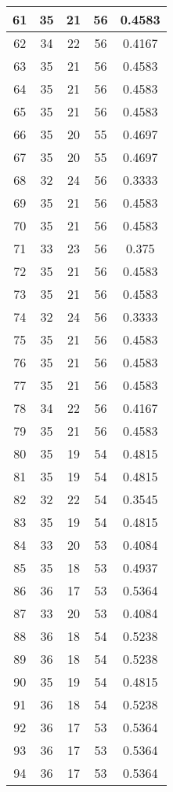 \documentclass[letterpaper, 12pt]{article}
\begin{document}
\begin{longtable}{|c|c|c|c|c|}
\hline
61 & 35 & 21 & 56 & 0.4583 \\
\hline
62 & 34 & 22 & 56 & 0.4167 \\
\hline
63 & 35 & 21 & 56 & 0.4583 \\
\hline
64 & 35 & 21 & 56 & 0.4583 \\
\hline
65 & 35 & 21 & 56 & 0.4583 \\
\hline
66 & 35 & 20 & 55 & 0.4697 \\
\hline
67 & 35 & 20 & 55 & 0.4697 \\
\hline
68 & 32 & 24 & 56 & 0.3333 \\
\hline
69 & 35 & 21 & 56 & 0.4583 \\
\hline
70 & 35 & 21 & 56 & 0.4583 \\
\hline
71 & 33 & 23 & 56 & 0.375 \\
\hline
72 & 35 & 21 & 56 & 0.4583 \\
\hline
73 & 35 & 21 & 56 & 0.4583 \\
\hline
74 & 32 & 24 & 56 & 0.3333 \\
\hline
75 & 35 & 21 & 56 & 0.4583 \\
\hline
76 & 35 & 21 & 56 & 0.4583 \\
\hline
77 & 35 & 21 & 56 & 0.4583 \\
\hline
78 & 34 & 22 & 56 & 0.4167 \\
\hline
79 & 35 & 21 & 56 & 0.4583 \\
\hline
80 & 35 & 19 & 54 & 0.4815 \\
\hline
81 & 35 & 19 & 54 & 0.4815 \\
\hline
82 & 32 & 22 & 54 & 0.3545 \\
\hline
83 & 35 & 19 & 54 & 0.4815 \\
\hline
84 & 33 & 20 & 53 & 0.4084 \\
\hline
85 & 35 & 18 & 53 & 0.4937 \\
\hline
86 & 36 & 17 & 53 & 0.5364 \\
\hline
87 & 33 & 20 & 53 & 0.4084 \\
\hline
88 & 36 & 18 & 54 & 0.5238 \\
\hline
89 & 36 & 18 & 54 & 0.5238 \\
\hline
90 & 35 & 19 & 54 & 0.4815 \\
\hline
91 & 36 & 18 & 54 & 0.5238 \\
\hline
92 & 36 & 17 & 53 & 0.5364 \\
\hline
93 & 36 & 17 & 53 & 0.5364 \\
\hline
94 & 36 & 17 & 53 & 0.5364 \\

\end{longtable}
\end{document}
